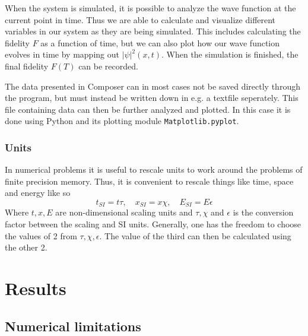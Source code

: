 \documentclass[a4paper, twocolumn]{revtex4-1}
\begin{document}
When the system is simulated, it is possible to analyze the wave function at the current point in time. Thus we are able to calculate and visualize different variables in our system as they are being simulated. This includes calculating the fidelity $F$ as a function of time, but we can also plot how our wave function evolves in time by mapping out $|\psi|^2(x,t)$. When the simulation is finished, the final fidelity $F(T)$ can be recorded.


The data presented in Composer can in most cases not be saved directly through the program, but must instead be written down in e.g. a textfile seperately. This file containing data can then be further analyzed and plotted. In this case it is done using Python and its plotting module \texttt{Matplotlib.pyplot}.

\subsubsection{Units}

In numerical problems it is useful to rescale units to work around the problems of finite precision memory. Thus, it is convenient to rescale things like time, space and energy like so 
\begin{equation}
	t_{SI} = t \tau, \quad  x_{SI} = x\chi, \quad  E_{SI} = E\epsilon
\end{equation}
Where $t,x,E$ are non-dimensional scaling units and $\tau, \chi$ and $\epsilon$ is the conversion factor between the scaling and SI units. Generally, one has the freedom to choose the values of 2 from $\tau, \chi, \epsilon$. The value of the third can then be calculated using the other 2. 




\section{\label{sec:results}Results}
\subsection{\label{subsec:numericalLimitations} Numerical limitations}
\end{document}
